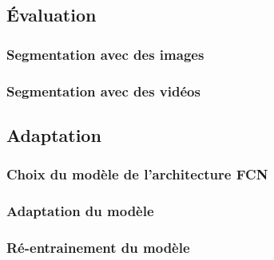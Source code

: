 \subsection{Évaluation}

\subsubsection{Segmentation avec des images}

\subsubsection{Segmentation avec des vidéos}

\subsection{Adaptation}

\subsubsection{Choix du modèle de l'architecture FCN}

\subsubsection{Adaptation du modèle}

\subsubsection{Ré-entrainement du modèle}
